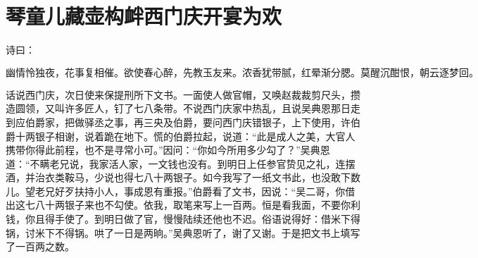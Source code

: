 

\chapter{琴童儿藏壶构衅\KG 西门庆开宴为欢}


诗曰：

\[
幽情怜独夜，花事复相催。欲使春心醉，先教玉友来。
浓香犹带腻，红晕渐分腮。莫醒沉酣恨，朝云逐梦回。
\]

话说西门庆，次日使来保提刑所下文书。一面使人做官帽，又唤赵裁裁剪尺头，攒造圆领，又叫许多匠人，钉了七八条带。不说西门庆家中热乱，且说吴典恩那日走到应伯爵家，把做驿丞之事，再三央及伯爵，要问西门庆错银子，上下使用，许伯爵十两银子相谢，说着跪在地下。慌的伯爵拉起，说道：“此是成人之美，大官人携带你得此前程，也不是寻常小可。”因问：“你如今所用多少勾了？”吴典恩道：“不瞒老兄说，我家活人家，一文钱也没有。到明日上任参官贽见之礼，连摆酒，并治衣类鞍马，少说也得七八十两银子。如今我写了一纸文书此，也没敢下数儿。望老兄好歹扶持小人，事成恩有重报。”伯爵看了文书，因说：“吴二哥，你借出这七八十两银子来也不勾使。依我，取笔来写上一百两。恒是看我面，不要你利钱，你且得手使了。到明日做了官，慢慢陆续还他也不迟。俗语说得好：借米下得锅，讨米下不得锅。哄了一日是两晌。”吴典恩听了，谢了又谢。于是把文书上填写了一百两之数。

